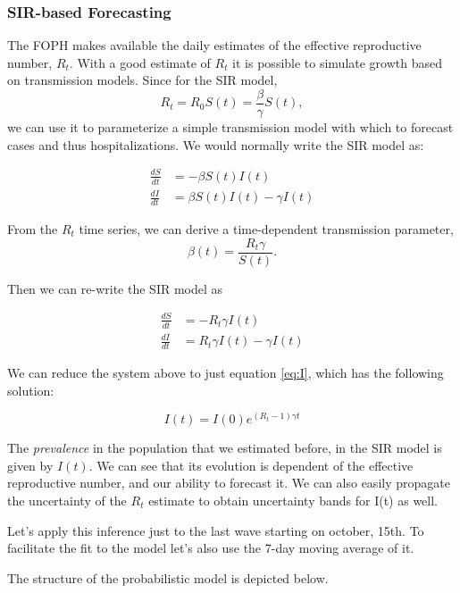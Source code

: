 \documentclass[11pt]{article}
\begin{document}
    
    \hypertarget{sir-based-forecasting}{%
\subsubsection{SIR-based Forecasting}\label{sir-based-forecasting}}

The FOPH makes available the daily estimates of the effective
reproductive number, $R_t$. With a good estimate of $R_t$ it is possible
to simulate growth based on transmission models. Since for the SIR
model, \[R_t = R_0 S(t)= \frac{\beta}{\gamma}S(t),\] we can use it to
parameterize a simple transmission model with which to forecast cases and
thus hospitalizations. We would normally write the SIR model as:

\begin{align}
\frac{dS}{dt} &= -\beta S(t)I(t)\\
\frac{dI}{dt} &= \beta S(t)I(t) -\gamma I(t)
\end{align}

From the $R_t$ time series, we can derive a time-dependent
transmission parameter, \[\beta(t)=\frac{R_t \gamma}{S(t)}.\]

Then we can re-write the SIR model as

\begin{align}
\frac{dS}{dt} &= -R_t\gamma I(t)\\
\frac{dI}{dt} &= R_t\gamma I(t) -\gamma I(t) \label{eq:I}
\end{align}

We can reduce the system above to just equation \ref{eq:I}, which has
the following solution:

\[I(t) = I(0) e^{(R_t-1)\gamma t}\]

The \emph{prevalence} in the population that we estimated before, in the
SIR model is given by \(I(t)\). We can see that its evolution is
dependent of the effective reproductive number, and our ability to
forecast it. We can also easily propagate the uncertainty of the \(R_t\)
estimate to obtain uncertainty bands for I(t) as well.

    Let's apply this inference just to the last wave starting on october,
15th. To facilitate the fit to the model let's also use the 7-day moving
average of it.

    
    

    The structure of the probabilistic model is depicted below.
 
            
    
    \begin{center}
    \end{center}
    { \hspace*{\fill} \\}
    
\end{document}
